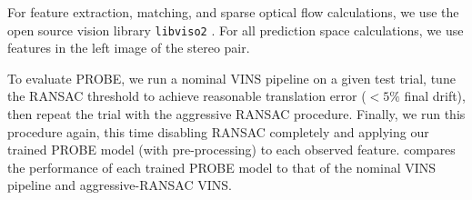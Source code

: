 For feature extraction, matching, and sparse optical flow calculations, we use the open source vision library \texttt{libviso2} \citep{Geiger2011-xe}.
For all prediction space calculations, we use features in the left image of the stereo pair.

To evaluate PROBE, we run a nominal VINS pipeline on a given test trial, tune the RANSAC threshold to achieve reasonable translation error ($< 5\%$ final drift), then repeat the trial with the aggressive RANSAC procedure. Finally, we run this procedure again, this time disabling RANSAC completely and applying our trained PROBE model (with pre-processing) to each observed feature.   compares the performance of each trained PROBE model to that of the nominal VINS pipeline and aggressive-RANSAC VINS.

\begin{table}
    \centering
    

\end{table}
